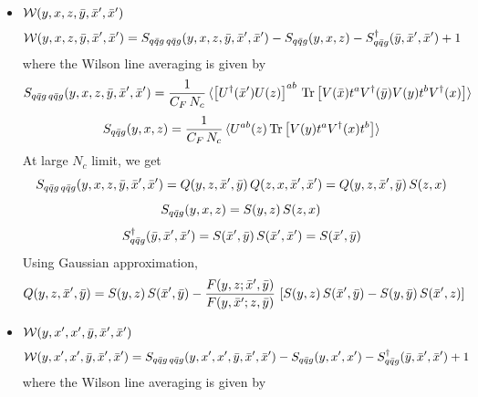 \documentclass[9pt]{article}
\numberwithin{equation}{section}
\begin{document}
\begin{itemize}
At large $N_{c}$ limit, we get
$$S_{q\Bar{q}g\,q\Bar{q}g}(y,x',x',\Bar{y},\Bar{x},\Bar{z}) = Q(y,x',\Bar{z},\Bar{y})\, Q(x',x',\Bar{x},\Bar{z}) = Q(y,x',\Bar{z},\Bar{y})\, S(\Bar{x},\Bar{z})$$
$$S_{q\Bar{q}g}(y,x',x') = S(y,x')\, S(x',x') = S(y,x') $$
$$S^{\dagger}_{q\Bar{q}g}(\Bar{y},\Bar{x},\Bar{z}) = S(\Bar{z},\Bar{y})\, S(\Bar{x},\Bar{z})$$
Using Gaussian approximation,
\begin{align}
    Q(y,x',\Bar{z},\Bar{y}) & = S(y,x')\,S(\Bar{z},\Bar{y}) - \frac{F(y,x';\Bar{z},\Bar{y})}{F(y,\Bar{z};x',\Bar{y})}\, \left[S(y,x')\,S(\Bar{z},\Bar{y})-S(y,\Bar{y})\,S(\Bar{z},x')\right]
\end{align}
\item $\mathcal{W}(y,x,z,\Bar{y},\Bar{x}',\Bar{x}')$
\begin{align}
        \mathcal{W}(y,x,z,\Bar{y},\Bar{x}',\Bar{x}') & = S_{q\Bar{q}g\,q\Bar{q}g}(y,x,z,\Bar{y},\Bar{x}',\Bar{x}') -S_{q\Bar{q}g}(y,x,z) - S^{\dagger}_{q\Bar{q}g}(\Bar{y},\Bar{x}',\Bar{x}') + 1
    \end{align}
where the Wilson line averaging is given by 
$$S_{q\Bar{q}g\,q\Bar{q}g}(y,x,z,\Bar{y},\Bar{x}',\Bar{x}') = \frac{1}{C_{F}\,N_{c}}\, \langle \left[U^{\dagger}(\Bar{x}')U(z)\right]^{ab}\, \text{Tr}\left[V(\Bar{x})t^{a}V^{\dagger}(\Bar{y})V(y)t^{b}V^{\dagger}(x)\right] \rangle$$
$$S_{q\Bar{q}g}(y,x,z) =  \frac{1}{C_{F}\,N_{c}}\, \langle U^{ab}(z)\,\text{Tr}\left[V(y)t^{a}V^{\dagger}(x)t^{b}\right]\rangle$$
At large $N_{c}$ limit, we get
$$S_{q\Bar{q}g\,q\Bar{q}g}(y,x,z,\Bar{y},\Bar{x}',\Bar{x}') = Q(y,z,\Bar{x}',\Bar{y})\, Q(z,x,\Bar{x}',\Bar{x}') = Q(y,z,\Bar{x}',\Bar{y})\, S(z,x) $$
$$S_{q\Bar{q}g}(y,x,z) = S(y,z)\, S(z,x)$$
$$S^{\dagger}_{q\Bar{q}g}(\Bar{y},\Bar{x}',\Bar{x}') = S(\Bar{x}',\Bar{y})\, S(\Bar{x}',\Bar{x}') = S(\Bar{x}',\Bar{y})$$
Using Gaussian approximation,
\begin{align}
    Q(y,z,\Bar{x}',\Bar{y}) & = S(y,z)\,S(\Bar{x}',\Bar{y}) - \frac{F(y,z;\Bar{x}',\Bar{y})}{F(y,\Bar{x}';z,\Bar{y})}\, \left[S(y,z)\,S(\Bar{x}',\Bar{y})-S(y,\Bar{y})\, S(\Bar{x}',z)\right]
\end{align}
\item $\mathcal{W}(y,x',x',\Bar{y},\Bar{x}',\Bar{x}')$
    \begin{align}
        \mathcal{W}(y,x',x',\Bar{y},\Bar{x}',\Bar{x}') & = S_{q\Bar{q}g\,q\Bar{q}g}(y,x',x',\Bar{y},\Bar{x}',\Bar{x}') -S_{q\Bar{q}g}(y,x',x') - S^{\dagger}_{q\Bar{q}g}(\Bar{y},\Bar{x}',\Bar{x}') + 1
    \end{align}
where the Wilson line averaging is given by 

\end{itemize}
\end{document}
